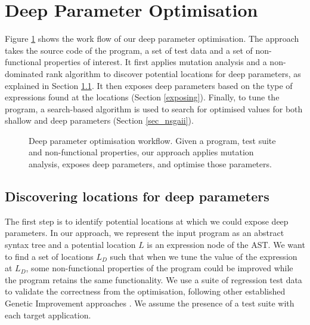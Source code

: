 \section{Deep Parameter Optimisation}
\label{sec_deep_parameter_optimisation}

Figure \ref{system} shows the work flow of our deep parameter optimisation. The approach takes the source code of the program, a set of test data and a set of non-functional properties of interest. 
It first applies mutation analysis and a non-dominated rank algorithm to discover potential locations for deep parameters, as explained in Section \ref{discovering}. It then exposes deep parameters based on the type of expressions found at the locations (Section \ref{exposing}). Finally, to tune the program, a search-based algorithm is used to search for optimised values for both shallow and deep parameters (Section \ref{sec_nsgaii}).

\begin{figure}[htbp]
\centering
{}
\caption{Deep parameter optimisation workflow. Given a program, test suite and non-functional properties, our approach applies mutation analysis, exposes deep parameters, and optimise those parameters.}\label{system}
\end{figure}

\subsection{Discovering locations for deep parameters}
\label{discovering}
The first step is to identify potential locations at which we could expose deep parameters. 
In our approach, we represent the input program as an abstract syntax tree and a potential location $L$ is an expression node of the AST. 
We want to find a set of locations $L_D$ such that when we tune the value of the expression at $L_D$, some non-functional properties of the program could be improved while the program retains the same functionality. 
We use a suite of regression test data to validate the correctness from the optimisation, following other established Genetic Improvement approaches \cite{justyna2013, Langdon:2014:IMI:2576768.2598244}. We assume the presence of a test suite with each target application.

